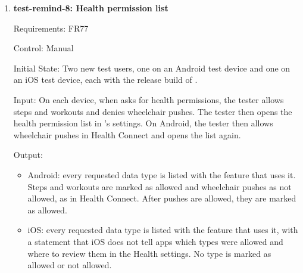 \documentclass[12pt, titlepage]{article}
\begin{document}
\begin{enumerate}
Test Case Derivation: The fit criterion of FR76 requires that no further
health data be read after the user withdraws consent in the app. Withdrawing
consent in the app does not remove \progname{}'s permission in the phone's
settings, and on iOS the app cannot remove it, so the health platform would
still answer reads. The app must stop reading on its own, so the test watches
the app's reads, not the permission. The sync before the withdrawal shows that
the test platform records reads, so the test cannot pass only because no read
was ever recorded. After the withdrawal, the test tries each way the app can
read health data: opening the app, the background sync, and the activity
screen. The new records give the app something to read.

How test will be performed: A Jest test replaces the health platform and the
backend's activity endpoint with test versions, runs the steps, and checks the
reads and requests each one records.

\item{\textbf{test-remind-8: Health permission list}\\}

Requirements: FR77

Control: Manual

Initial State: Two new test users, one on an Android test device and one on
an iOS test device, each with the release build of \progname{}.

Input: On each device, when \progname{} asks for health permissions, the
tester allows steps and workouts and denies wheelchair pushes. The tester then
opens the health permission list in \progname{}'s settings. On Android, the
tester then allows wheelchair pushes in Health Connect and opens the list
again.

Output:
\begin{itemize}
  \item Android: every requested data type is listed with the feature that
    uses it. Steps and workouts are marked as allowed and wheelchair pushes as
    not allowed, as in Health Connect. After pushes are allowed, they are
    marked as allowed.
  \item iOS: every requested data type is listed with the feature that uses
    it, with a statement that iOS does not tell apps which types were allowed
    and where to review them in the Health settings. No type is marked as
    allowed or not allowed.
\end{itemize}


\end{enumerate}
\end{document}
